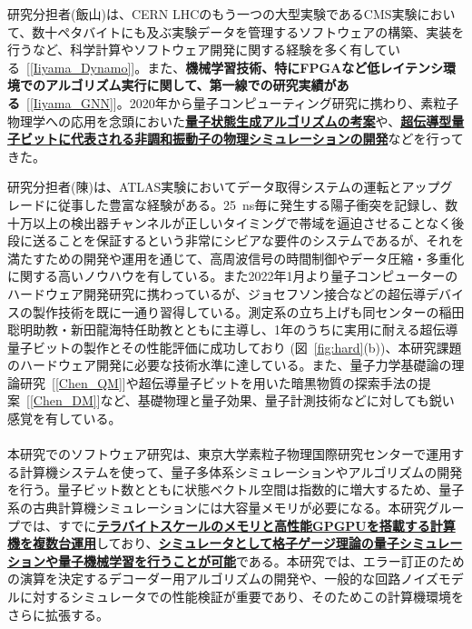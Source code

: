 \documentclass[11pt,a4j,dvipdfmx]{jarticle} 					%
\newcommand{\研究課題名}{誤り耐性量子コンピュータに向けた誤り訂正技術の開発(仮)}
\newcommand{\研究機関名}{東京大学}
\newcommand{\研究代表者氏名}{寺師弘二}
\newcommand{\研究期間の最終元号年度}{10}  %
\newcommand{\mybf}[1]{{\bfseries\sffamily#1}}
\begin{document}
研究分担者(飯山)は、CERN LHCのもう一つの大型実験であるCMS実験において、数十ペタバイトにも及ぶ実験データを管理するソフトウェアの構築、実装を行うなど、科学計算やソフトウェア開発に関する経験を多く有している~[\ref{Iiyama_Dynamo}]。また、\mybf{機械学習技術、特にFPGAなど低レイテンシ環境でのアルゴリズム実行に関して、第一線での研究実績がある}~[\ref{Iiyama_GNN}]。2020年から量子コンピューティング研究に携わり、素粒子物理学への応用を念頭においた\mybf{\ul{量子状態生成アルゴリズムの考案}}や、\mybf{\ul{超伝導型量子ビットに代表される非調和振動子の物理シミュレーションの開発}}などを行ってきた。

研究分担者(陳)は、ATLAS実験においてデータ取得システムの運転とアップグレードに従事した豊富な経験がある。25~ns毎に発生する陽子衝突を記録し、数十万以上の検出器チャンネルが正しいタイミングで帯域を逼迫させることなく後段に送ることを保証するという非常にシビアな要件のシステムであるが、それを満たすための開発や運用を通じて、高周波信号の時間制御やデータ圧縮・多重化に関する高いノウハウを有している。また2022年1月より量子コンピューターのハードウェア開発研究に携わっているが、ジョセフソン接合などの超伝導デバイスの製作技術を既に一通り習得している。測定系の立ち上げも同センターの稲田聡明助教・新田龍海特任助教とともに主導し、1年のうちに実用に耐える超伝導量子ビットの製作とその性能評価に成功しており (図~\ref{fig:hard}(b))、本研究課題のハードウェア開発に必要な技術水準に達している。また、量子力学基礎論の理論研究~[\ref{Chen_QM}]や超伝導量子ビットを用いた暗黒物質の探索手法の提案~[\ref{Chen_DM}]など、基礎物理と量子効果、量子計測技術などに対しても鋭い感覚を有している。\vspace{-2mm}\\


\\
本研究でのソフトウェア研究は、東京大学素粒子物理国際研究センターで運用する計算機システムを使って、量子多体系シミュレーションやアルゴリズムの開発を行う。量子ビット数とともに状態ベクトル空間は指数的に増大するため、量子系の古典計算機シミュレーションには大容量メモリが必要になる。本研究グループでは、すでに\mybf{\ul{テラバイトスケールのメモリと高性能GPGPUを搭載する計算機を複数台運用}}しており、\mybf{\ul{シミュレータとして格子ゲージ理論の量子シミュレーションや量子機械学習を行うことが可能}}である。本研究では、エラー訂正のための演算を決定するデコーダー用アルゴリズムの開発や、一般的な回路ノイズモデルに対するシミュレータでの性能検証が重要であり、そのためこの計算機環境をさらに拡張する。
\end{document}
